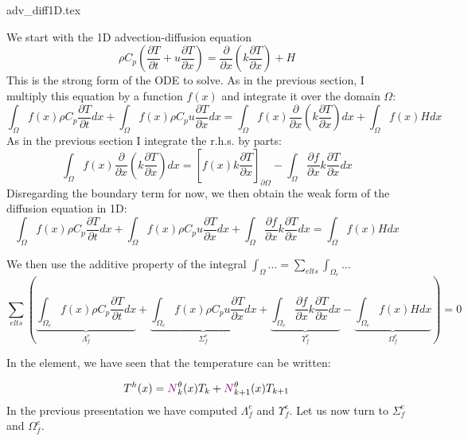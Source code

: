 \begin{flushright} {\tiny {\color{gray} adv\_diff1D.tex}} \end{flushright}

We start with the 1D advection-diffusion equation
\begin{equation}
\rho C_p \left( \frac{\partial T}{\partial t} 
+ u \frac{\partial T}{\partial x}
\right)
= \frac{\partial }{\partial x} \left( k \frac{\partial T}{\partial x}  \right)
+H
\end{equation}
This is the {\color{olive}strong form} of the ODE to solve.
As in the previous section, I multiply this equation by a function $f(x)$ and integrate it over 
the domain $\Omega$:
\[
\int_{\Omega} f(x)  \rho C_p\frac{\partial T}{\partial t} dx
+
\int_{\Omega} f(x)  \rho C_p u \frac{\partial T}{\partial x} dx
\!=\!
\int_{\Omega} f(x) \frac{\partial }{\partial x}\! \left(\! k\! \frac{\partial T}{\partial x}\!  \right)\! dx
+
\int_{\Omega} f(x) H dx 
\]
As in the previous section I integrate the r.h.s. by parts:
\[
\int_{\Omega} f(x) \frac{\partial }{\partial x} \left( k \frac{\partial T}{\partial x}  \right) dx
=
\left[
f(x) k \frac{\partial T}{\partial x}
\right]_{\partial \Omega}
-
\int_{\Omega} \frac{\partial f}{\partial x}  k \frac{\partial T}{\partial x}  dx
\]
Disregarding the boundary term for now, 
we then obtain the {\color{olive}weak form} of the diffusion equation in 1D:
\[
\boxed{
\int_{\Omega} f(x) \rho C_p \frac{\partial T}{\partial t} dx
+
\int_{\Omega} f(x)  \rho C_p u \frac{\partial T}{\partial x} dx
+
\int_{\Omega} \frac{\partial f}{\partial x}  k \frac{\partial T}{\partial x}  dx = 
\int_{\Omega} f(x) H dx 
}
\]

We then use the additive property of the integral $\int_\Omega \dots = \sum_{elts} \int_{\Omega_e} \dots$
\[
\sum_{elts} \left(     
\underbrace{ \int_{\Omega_e} f(x) \rho C_p   \frac{\partial T}{\partial t} dx }_{{\Lambda}_f^e}
+
\underbrace{  \int_{\Omega_e} f(x)  \rho C_p u \frac{\partial T}{\partial x} dx  }_{{\Sigma}_f^e}
+
\underbrace{\int_{\Omega_e} \frac{\partial f}{\partial x}  k \frac{\partial T}{\partial x}  dx}_{{\Upsilon}_f^e}    
- 
\underbrace{\int_{\Omega_e} f(x) H dx }_{{\Omega}_f^e}
  \right) = 0  
\]

In the element, we have seen that the temperature can be written:

\[
T^h(x) 
= {\color{violet}N}^\theta_{k}(x) T_k + {\color{violet}N}^\theta_{k+1}(x) T_{k+1}  
\]
In the previous presentation we have computed  ${\Lambda}_f^e$ and ${\Upsilon}_f^e$.
Let us now turn to ${\Sigma}_f^e$ and ${\Omega}_f^e$.

